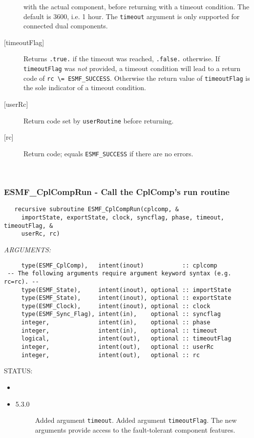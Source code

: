 \begin{description}
     with the actual component, before returning with a timeout condition.
     The default is 3600, i.e. 1 hour. The {\tt timeout} argument is only
     supported for connected dual components.
   \item[{[timeoutFlag]}]
     Returns {\tt .true.} if the timeout was reached, {\tt .false.} otherwise.
     If {\tt timeoutFlag} was {\em not} provided, a timeout condition will lead
     to a return code of {\tt rc \textbackslash = ESMF\_SUCCESS}. Otherwise the
     return value of {\tt timeoutFlag} is the sole indicator of a timeout
     condition.
   \item[{[userRc]}]
     Return code set by {\tt userRoutine} before returning.
   \item[{[rc]}]
     Return code; equals {\tt ESMF\_SUCCESS} if there are no errors.
   \end{description}
   
 
\mbox{}\hrulefill\ 
 
\subsubsection [ESMF\_CplCompRun] {ESMF\_CplCompRun - Call the CplComp's run routine}


  
\begin{verbatim}   recursive subroutine ESMF_CplCompRun(cplcomp, &
     importState, exportState, clock, syncflag, phase, timeout, timeoutFlag, &
     userRc, rc)\end{verbatim}{\em ARGUMENTS:}
\begin{verbatim}     type(ESMF_CplComp),   intent(inout)           :: cplcomp
 -- The following arguments require argument keyword syntax (e.g. rc=rc). --
     type(ESMF_State),     intent(inout), optional :: importState
     type(ESMF_State),     intent(inout), optional :: exportState
     type(ESMF_Clock),     intent(inout), optional :: clock
     type(ESMF_Sync_Flag), intent(in),    optional :: syncflag
     integer,              intent(in),    optional :: phase
     integer,              intent(in),    optional :: timeout
     logical,              intent(out),   optional :: timeoutFlag
     integer,              intent(out),   optional :: userRc
     integer,              intent(out),   optional :: rc\end{verbatim}
{\sf STATUS:}
   \begin{itemize}
   \item{}
   \item{}
   \begin{description}
   \item[5.3.0] Added argument {\tt timeout}.
                Added argument {\tt timeoutFlag}.
                The new arguments provide access to the fault-tolerant component
                features.
   \end{description}
   \end{itemize}
  
